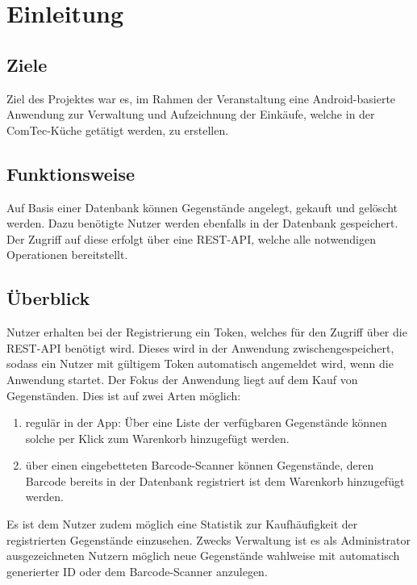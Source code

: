 \section{Einleitung}\label{sec:einleitung}

\subsection{Ziele}\label{subsec:ziele}

Ziel des Projektes war es, im Rahmen der Veranstaltung  eine Android-basierte Anwendung zur Verwaltung und Aufzeichnung der Einkäufe, welche in der ComTec-Küche getätigt werden, zu erstellen.

\subsection{Funktionsweise}\label{subsec:funktionsweise}

Auf Basis einer Datenbank können Gegenstände angelegt, gekauft und gelöscht werden.
Dazu benötigte Nutzer werden ebenfalls in der Datenbank gespeichert.
Der Zugriff auf diese erfolgt über eine REST-API, welche alle notwendigen Operationen bereitstellt.

\subsection{Überblick}\label{subsec:überblick}

Nutzer erhalten bei der Registrierung ein Token, welches für den Zugriff über die REST-API benötigt wird.
Dieses wird in der Anwendung zwischengespeichert, sodass ein Nutzer mit gültigem Token automatisch angemeldet wird, wenn die Anwendung startet.
Der Fokus der Anwendung liegt auf dem Kauf von Gegenständen.
Dies ist auf zwei Arten möglich:

\begin{enumerate}
	\item regulär in der App: Über eine Liste der verfügbaren Gegenstände können solche per Klick zum Warenkorb hinzugefügt werden.

	\item über einen eingebetteten Barcode-Scanner können Gegenstände, deren Barcode bereits in der Datenbank registriert ist dem Warenkorb hinzugefügt werden.
\end{enumerate}

Es ist dem Nutzer zudem möglich eine Statistik zur Kaufhäufigkeit der registrierten Gegenstände einzusehen.
Zwecks Verwaltung ist es als Administrator ausgezeichneten Nutzern möglich neue Gegenstände wahlweise mit automatisch generierter ID oder dem Barcode-Scanner anzulegen.

